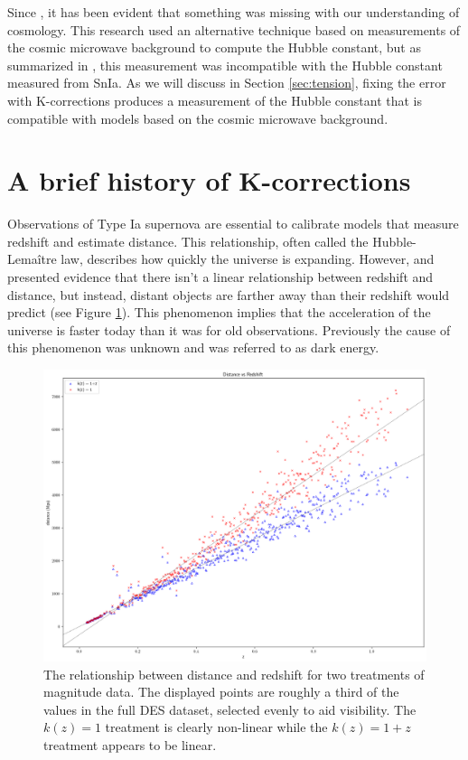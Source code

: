 \documentclass{article}
\begin{document}
Since \citet{planck2020}, it has been evident that something was missing with
our understanding of cosmology. This research used an alternative technique
based on measurements of the cosmic microwave background to compute the Hubble
constant, but as summarized in \citet{perivolaropoulos2022}, this measurement
was incompatible with the Hubble constant measured from SnIa. As we will
discuss in Section \ref{sec:tension}, fixing the error with K-corrections
produces a measurement of the Hubble constant that is compatible with models
based on the cosmic microwave background.

\section{A brief history of K-corrections}
\label{sec:history}

Observations of Type Ia supernova are essential to calibrate models that
measure redshift and estimate distance. This relationship, often called the
Hubble-Lema\^{i}tre law, describes how quickly the universe is expanding.
However, \citet{riess1998} and \citet{perlmutter1999} presented evidence that
there isn't a linear relationship between redshift and distance, but instead,
distant objects are farther away than their redshift would predict (see Figure
\ref{fig:mu_distance_vs_redshift}). This phenomenon implies that the
acceleration of the universe is faster today than it was for old observations.
Previously the cause of this phenomenon was unknown and was referred to as
dark energy.

\begin{figure}[h]
  \includegraphics[width=\linewidth]{mu_distance_vs_redshift.png}
  \caption{The relationship between distance and redshift for two treatments of
  magnitude data. The displayed points are roughly a third of the values in the
  full DES dataset, selected evenly to aid visibility. The $k(z) = 1$ treatment
  is clearly non-linear while the $k(z) = 1 + z$ treatment appears to be
  linear.}
  \label{fig:mu_distance_vs_redshift}
\end{figure}
\end{document}
